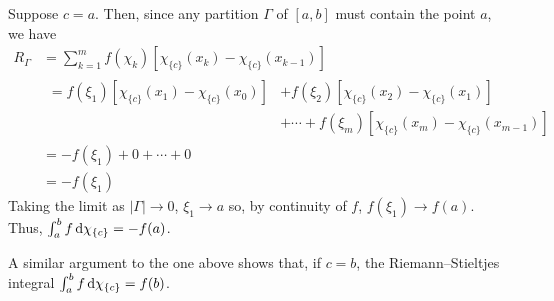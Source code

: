 \begin{solution}
  Suppose $c=a$. Then, since any partition $\Gamma$ of $[a,b]$ must contain
  the point $a$, we have
  \begin{equation}
    \label{eq:prep:1:18}
    \begin{aligned}
      R_\Gamma
      &=\sum_{k=1}^mf(\chi_k)[\chi_{\{c\}}(x_k)-\chi_{\{c\}}(x_{k-1})]\\
      &
      \begin{aligned}
        =f(\xi_1)[\chi_{\{c\}}(x_1)-\chi_{\{c\}}(x_0)]&
        +f(\xi_2)[\chi_{\{c\}}(x_2)-\chi_{\{c\}}(x_1)]\\
        &+\dotsb+f(\xi_m)[\chi_{\{c\}}(x_m)-\chi_{\{c\}}(x_{m-1})]
      \end{aligned}\\
      &=-f(\xi_1)+0+\dotsb+0\\
      &=-f(\xi_1)
    \end{aligned}
  \end{equation}
  Taking the limit as $|\Gamma|\to 0$, $\xi_1\to a$ so, by continuity of
  $f$, $f(\xi_1)\to f(a)$. Thus, $\int_a^b f\mathop{}\!\mathrm{d}\chi_{\{c\}}=-f(a)$.

  A similar argument to the one above shows that, if $c=b$, the
  Riemann--Stieltjes integral $\int_a^bf\mathop{}\!\mathrm{d}\chi_{\{c\}}=f(b)$.
\end{solution}

